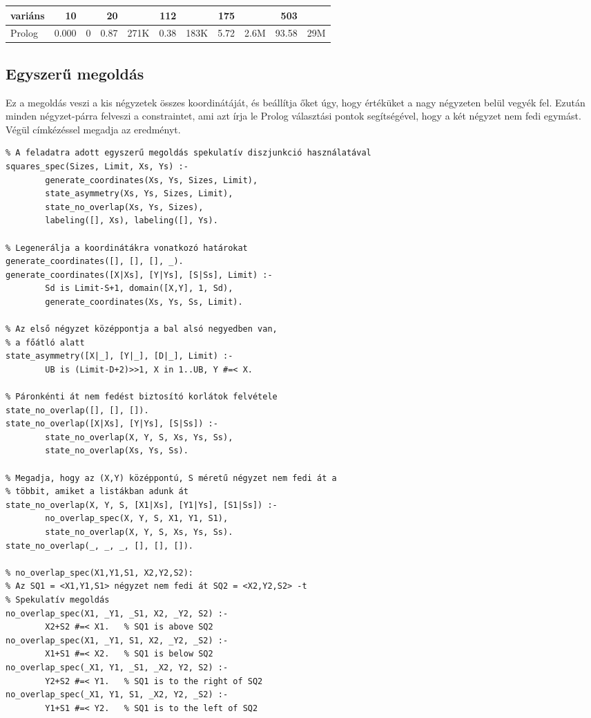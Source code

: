 \begin{center}
\begin{tabular}{|l|rr|rr|rr|rr|rr|}
\hline
variáns   & 10     &      &  20   &      & 112    &      & 175   &    & 503  &\\
\hline
Prolog          &  0.000 &     0&  0.87& 271K &  0.38 &  183K & 5.72 & 2.6M
&93.58 & 29M \\
\hline
\end{tabular}
\end{center}

\subsection{Egyszerű \clpfd megoldás}

Ez a megoldás veszi a kis négyzetek összes koordinátáját, és beállítja
őket úgy, hogy értéküket a nagy négyzeten belül vegyék fel. Ezután
minden négyzet-párra felveszi a  constraintet,
ami azt írja le Prolog választási pontok segítségével, hogy a két
négyzet nem fedi egymást. Végül címkézéssel megadja az eredményt.

\begin{verbatim}
% A feladatra adott egyszerű megoldás spekulatív diszjunkció használatával
squares_spec(Sizes, Limit, Xs, Ys) :-
        generate_coordinates(Xs, Ys, Sizes, Limit),
        state_asymmetry(Xs, Ys, Sizes, Limit),
        state_no_overlap(Xs, Ys, Sizes),
        labeling([], Xs), labeling([], Ys).

% Legenerálja a koordinátákra vonatkozó határokat
generate_coordinates([], [], [], _).
generate_coordinates([X|Xs], [Y|Ys], [S|Ss], Limit) :-
        Sd is Limit-S+1, domain([X,Y], 1, Sd),
        generate_coordinates(Xs, Ys, Ss, Limit).

% Az első négyzet középpontja a bal alsó negyedben van,
% a főátló alatt
state_asymmetry([X|_], [Y|_], [D|_], Limit) :-
        UB is (Limit-D+2)>>1, X in 1..UB, Y #=< X.

% Páronkénti át nem fedést biztosító korlátok felvétele
state_no_overlap([], [], []).
state_no_overlap([X|Xs], [Y|Ys], [S|Ss]) :-
        state_no_overlap(X, Y, S, Xs, Ys, Ss),
        state_no_overlap(Xs, Ys, Ss).

% Megadja, hogy az (X,Y) középpontú, S méretű négyzet nem fedi át a
% többit, amiket a listákban adunk át
state_no_overlap(X, Y, S, [X1|Xs], [Y1|Ys], [S1|Ss]) :-
        no_overlap_spec(X, Y, S, X1, Y1, S1),
        state_no_overlap(X, Y, S, Xs, Ys, Ss).
state_no_overlap(_, _, _, [], [], []).

% no_overlap_spec(X1,Y1,S1, X2,Y2,S2):
% Az SQ1 = <X1,Y1,S1> négyzet nem fedi át SQ2 = <X2,Y2,S2> -t
% Spekulatív megoldás
no_overlap_spec(X1, _Y1, _S1, X2, _Y2, S2) :-
        X2+S2 #=< X1.   % SQ1 is above SQ2
no_overlap_spec(X1, _Y1, S1, X2, _Y2, _S2) :-
        X1+S1 #=< X2.   % SQ1 is below SQ2
no_overlap_spec(_X1, Y1, _S1, _X2, Y2, S2) :-
        Y2+S2 #=< Y1.   % SQ1 is to the right of SQ2
no_overlap_spec(_X1, Y1, S1, _X2, Y2, _S2) :-
        Y1+S1 #=< Y2.   % SQ1 is to the left of SQ2
\end{verbatim}

